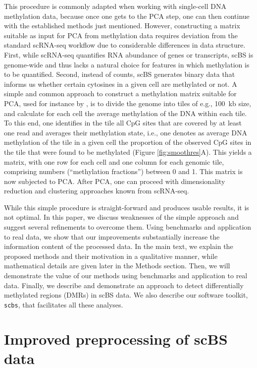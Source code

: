 \documentclass[twocolumn,10pt]{article}
\begin{document}
This procedure is commonly adapted when working with single-cell DNA methylation data, because once one gets to the PCA step, one can then continue with the established methods just mentioned.
However, constructing a matrix suitable as input for PCA from methylation data requires deviation from the standard scRNA-seq workflow due to considerable differences in data structure.
First, while scRNA-seq quantifies RNA abundance of genes or transcripts, scBS is genome-wide and thus lacks a natural choice for features in which methylation is to be quantified.
Second, instead of counts, scBS generates binary data that informs us whether certain cytosines in a given cell are methylated or not.
A simple and common approach to construct a methylation matrix suitable for PCA, used for instance by \citet{luo2017single}, is to divide the genome into tiles of e.g., 100~kb size, and calculate for each cell the average methylation of the DNA within each tile.
To this end, one identifies in the tile all CpG sites that are covered by at least one read and averages their methylation state, i.e., one denotes as average DNA methylation of the tile in a given cell the proportion of the observed CpG sites in the tile that were found to be methylated (Figure \ref{fig:smoothres}A).
This yields a matrix, with one row for each cell and one column for each genomic tile, comprising numbers (``methylation fractions'') between 0 and 1.
This matrix is now subjected to PCA.
After PCA, one can proceed with dimensionality reduction and clustering approaches known from scRNA-seq.

While this simple procedure is straight-forward and produces usable results, it is not optimal.
In this paper, we discuss weaknesses of the simple approach and suggest several refinements to overcome them.
Using benchmarks and application to real data, we show that our improvements substantially increase the information content of the processed data.
In the main text, we explain the proposed methods and their motivation in a qualitative manner, while mathematical details are given later in the Methods section.
Then, we will demonstrate the value of our methods using benchmarks and application to real data.
Finally, we describe and demonstrate an approach to detect differentially methylated regions (DMRs) in scBS data.
We also describe our software toolkit, \texttt{scbs}, that facilitates all these analyses.

\section{Improved preprocessing of scBS data}
\end{document}
